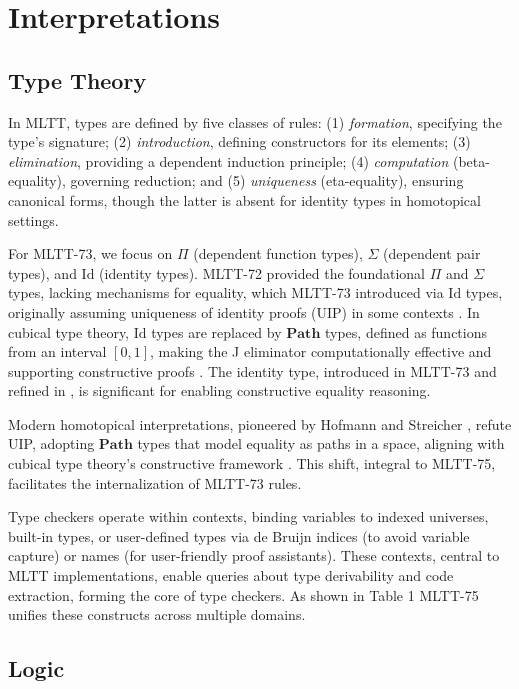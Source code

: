 \documentclass{article}
\begin{document}
\section{Interpretations}

\subsection{Type Theory}

In MLTT, types are defined by five classes of rules:
(1) \textit{formation}, specifying the type’s signature;
(2) \textit{introduction}, defining constructors for its elements;
(3) \textit{elimination}, providing a dependent induction principle;
(4) \textit{computation} (beta-equality), governing reduction; and
(5) \textit{uniqueness} (eta-equality), ensuring canonical forms,
though the latter is absent for identity types in homotopical settings.

For MLTT-73, we focus on $\Pi$ (dependent function types), $\Sigma$ (dependent pair types), and $\text{Id}$ (identity types).
MLTT-72 provided the foundational $\Pi$ and $\Sigma$ types, lacking mechanisms for equality, which MLTT-73 introduced via $\text{Id}$ types,
originally assuming uniqueness of identity proofs (UIP) in some contexts \cite{Lof75}.
In cubical type theory, $\text{Id}$ types are replaced by $\mathbf{Path}$ types, defined as functions from an interval $[0,1]$,
making the J eliminator computationally effective and supporting constructive proofs \cite{HoTT13}.
The identity type, introduced in MLTT-73 and refined in \cite{Lof75}, is significant for enabling constructive equality reasoning.

Modern homotopical interpretations, pioneered by Hofmann and Streicher \cite{Hofmann96},
refute UIP, adopting $\mathbf{Path}$ types that model equality as paths in a space,
aligning with cubical type theory’s constructive framework \cite{Mortberg17}. This shift,
integral to MLTT-75, facilitates the internalization of MLTT-73 rules.

Type checkers operate within contexts, binding variables to indexed universes,
built-in types, or user-defined types via de Bruijn indices (to avoid variable capture)
or names (for user-friendly proof assistants).
These contexts, central to MLTT implementations, enable queries about type
derivability and code extraction, forming the core of type checkers.
As shown in Table 1 MLTT-75 unifies these constructs across multiple domains.

\subsection{Logic}
\end{document}
